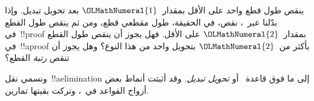 \documentclass[../../../include/open-logic-section]{subfiles}
\begin{document}
\begin{prob}
ينقص طول قطع واحد على الأقل بمقدار~$\OLMathNumeral{1}$ بعد تحويل تبديل. وإذا بدّلنا
\Elim{\land} عبر~\Elim{\lor}، نقص، في الحقيقة، طول مقطعي قطع، ومن ثم
ينقص طول القطع في~!!{proof} بمقدار~$\OLMathNumeral{2}$ على الأقل. فهل يجوز أن ينقص طول
القطع في~!!a{proof} بأكثر من~$\OLMathNumeral{2}$ بتحويل واحد من هذا النوع؟ وهل يجوز أن
تنقص \emph{رتبة} القطع؟
\end{prob}

ونسمي نقل~!!a{elimination} إلى ما فوق قاعدة~\Elim{\lor} أو
\Elim{\lexists} \emph{تحويل تبديل}. وقد أثبتت أنماط بعض أزواج القواعد
في~، وتركت بقيتها تمارين.

\end{document}
